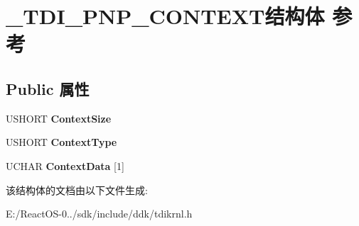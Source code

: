 \hypertarget{struct___t_d_i___p_n_p___c_o_n_t_e_x_t}{}\section{\+\_\+\+T\+D\+I\+\_\+\+P\+N\+P\+\_\+\+C\+O\+N\+T\+E\+X\+T结构体 参考}
\label{struct___t_d_i___p_n_p___c_o_n_t_e_x_t}
\subsection*{Public 属性}
\begin{DoxyCompactItemize}
\item 
\mbox{\label{struct___t_d_i___p_n_p___c_o_n_t_e_x_t_a40b68de52b85ac28b19d1077c69816d1}} 
U\+S\+H\+O\+RT {\bfseries Context\+Size}
\item 
\mbox{\label{struct___t_d_i___p_n_p___c_o_n_t_e_x_t_a80b0f6e2d1d5f2aafeb1fd4af1d1d031}} 
U\+S\+H\+O\+RT {\bfseries Context\+Type}
\item 
\mbox{\label{struct___t_d_i___p_n_p___c_o_n_t_e_x_t_a7c74f99583b99805d8ecaf3c5b519b0f}} 
U\+C\+H\+AR {\bfseries Context\+Data} \mbox{[}1\mbox{]}
\end{DoxyCompactItemize}


该结构体的文档由以下文件生成\+:\begin{DoxyCompactItemize}
\item 
E\+:/\+React\+O\+S-\/0../sdk/include/ddk/tdikrnl.\+h\end{DoxyCompactItemize}
